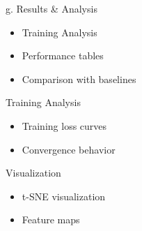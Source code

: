 \begin{frame}{g. Results \& Analysis}
\begin{itemize}
    \item Training Analysis
    \item Performance tables
    \item Comparison with baselines
\end{itemize}
\end{frame}

\begin{frame}{Training Analysis}
\begin{itemize}
    \item Training loss curves
    \item Convergence behavior
\end{itemize}
\end{frame}

\begin{frame}{Visualization}
\begin{itemize}
    \item t-SNE visualization
    \item Feature maps
\end{itemize}
\end{frame}




